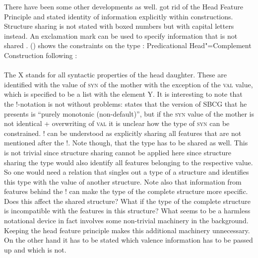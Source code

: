 \documentclass[output=paper]{langsci/langscibook}
\begin{document}
There have been some other developments as well. \citet{Sag2012a} got rid of the Head Feature
Principle and stated identity of information explicitly within constructions. Structure sharing is
not stated with boxed numbers but with capital letters instead. An exclamation mark can be used to
specify information that is not shared \citep[]{Sag2012a}. () shows the constraints on the type :
\eas
Predicational Head"=Complement Construction following \citet[]{Sag2012a}:\\
 \impl\\
\zs
The X stands for all syntactic properties of the head daughter. These are identified with the
value of \textsc{syn} of the mother with the exception of the \textsc{val} value, which is specified
to be a list with the element Y. It is interesting to note that the !-notation is not without
problems: \citet[]{Sag2012a} states that the version of SBCG that he presents is ``purely
monotonic (non-default)'', but if the \textsc{syn} value of the mother is not identical +
overwriting of \textsc{val} it is unclear how the type of \textsc{syn} can be constrained. ! can be
understood as explicitly sharing all features that are not mentioned after the !. Note though, that
the type has to be shared as well. This is not trivial since structure sharing cannot be applied
here since structure sharing the type would also identify all features belonging to the respective
value. So one would need a relation that singles out a type of a structure and identifies this type
with the value of another structure. Note also that information from features behind the ! can make
the type of the complete structure more specific. Does this affect the shared structure? What if the
type of the complete structure is incompatible with the features in this structure? What seems to be a harmless notational device in fact involves some
non-trivial machinery in the background. Keeping the head feature principle makes this additional machinery
unnecessary. On the other hand it has to be stated which valence information has to be passed up and
which is not.
\end{document}
